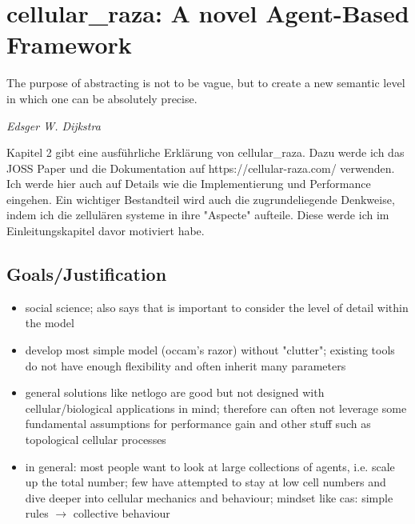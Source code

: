 \chapter{cellular\_raza: A novel Agent-Based Framework}

\epigraph{The purpose of abstracting is not to be vague, but to create a new semantic
level in which one can be absolutely precise.}
{\textit{Edsger W. Dijkstra}}

\cite{Pleyer2025}

Kapitel 2 gibt eine ausführliche Erklärung von cellular\_raza. Dazu werde ich das JOSS
Paper und die Dokumentation auf https://cellular-raza.com/ verwenden.
Ich werde hier auch auf Details wie die Implementierung und Performance eingehen.
Ein wichtiger Bestandteil wird auch die zugrundeliegende Denkweise, indem ich die
zellulären systeme in ihre "Aspecte" aufteile.
Diese werde ich im Einleitungskapitel davor motiviert habe.

\section{Goals/Justification}
\begin{itemize}
    \item \cite{Miller2007} social science; also says that is important to consider the level of
        detail within the model
    \item develop most simple model (occam's razor) without "clutter"; existing tools do not have
        enough flexibility and often inherit many parameters
    \item general solutions like netlogo  are good but not
        designed with cellular/biological applications in mind; therefore can often not leverage
        some fundamental assumptions for performance gain and other stuff such as topological
        cellular processes
    \item in general: most people want to look at large collections of agents, i.e. scale up the
        total number; few have attempted to stay at low cell numbers and dive deeper into cellular
        mechanics and behaviour; mindset like \acp{ca}: simple rules $\rightarrow$ collective
        behaviour
\end{itemize}

